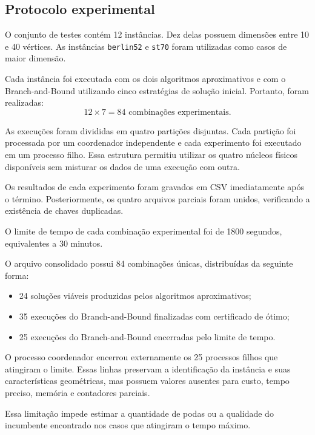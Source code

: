 \documentclass[12pt]{article}
\begin{document}
\subsection{Protocolo experimental}

O conjunto de testes contém 12 instâncias. Dez delas possuem dimensões entre 10 e 40 vértices. As instâncias \texttt{berlin52} e \texttt{st70} foram utilizadas como casos de maior dimensão.

Cada instância foi executada com os dois algoritmos aproximativos e com o Branch-and-Bound utilizando cinco estratégias de solução inicial. Portanto, foram realizadas:
\begin{equation}
 12 \times 7 = 84 \text{ combinações experimentais}.
\end{equation}

As execuções foram divididas em quatro partições disjuntas. Cada partição foi processada por um coordenador independente e cada experimento foi executado em um processo filho. Essa estrutura permitiu utilizar os quatro núcleos físicos disponíveis sem misturar os dados de uma execução com outra.

Os resultados de cada experimento foram gravados em CSV imediatamente após o término. Posteriormente, os quatro arquivos parciais foram unidos, verificando a existência de chaves duplicadas.

O limite de tempo de cada combinação experimental foi de 1800 segundos, equivalentes a 30 minutos.

O arquivo consolidado possui 84 combinações únicas, distribuídas da seguinte forma:
\begin{itemize}
  \item 24 soluções viáveis produzidas pelos algoritmos aproximativos;
  \item 35 execuções do Branch-and-Bound finalizadas com certificado de ótimo;
  \item 25 execuções do Branch-and-Bound encerradas pelo limite de tempo.
\end{itemize}

O processo coordenador encerrou externamente os 25 processos filhos que atingiram o limite. Essas linhas preservam a identificação da instância e suas características geométricas, mas possuem valores ausentes para custo, tempo preciso, memória e contadores parciais.

Essa limitação impede estimar a quantidade de podas ou a qualidade do incumbente encontrado nos casos que atingiram o tempo máximo.
\end{document}
